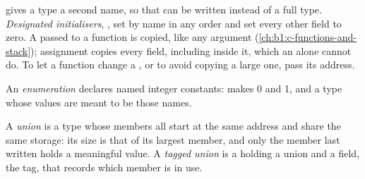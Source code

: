 \label{lst:b1:c-strings-structs-files:point}


 gives a type a second name, so that  can be written instead of a full  type.
\emph{Designated initialisers}, , set  by name in any order and set every other field to zero.
A  passed to a function is copied, like any argument (\cref{ch:b1:c-functions-and-stack}); assignment copies
every field, including  inside it, which an  alone cannot do. To let a function change a , or to
avoid copying a large one, pass its address.

\begin{definition}[Enumeration]\label{def:b1:c-strings-structs-files:enum}
An \emph{enumeration} declares named integer constants: 
makes  0 and  1, and  a type whose values are meant to be those names.
\end{definition}

\begin{definition}\label{def:b1:c-strings-structs-files:union}
A \emph{union} is a type whose members all start at the same address and share the same storage: its
size is that of its largest member, and only the member last written holds a meaningful value. A \emph{tagged
union} is a  holding a union and a field, the tag, that records which member is in use.
\end{definition}

\label{lst:b1:c-strings-structs-files:shapes}

